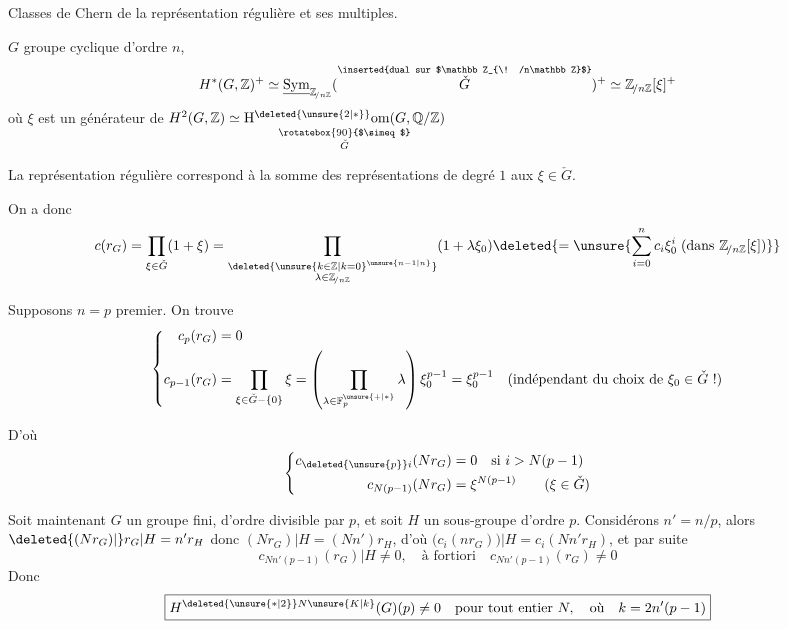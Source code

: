 
Classes de Chern de la représentation régulière et ses multiples.

$G$ groupe cyclique d'ordre $n$,
\[
H^*(G,\mathbb Z)^+ \simeq
\underline{\mathrm{Sym}}_{\mathbb Z_{\! /n\mathbb Z}}
  (\overset{\text{\scriptsize\inserted{dual sur $\mathbb Z_{\! /n\mathbb Z}$}}}{\check G})^+
\simeq \mathbb Z_{\! /n\mathbb Z}[\xi]^+
\]
où $\xi$ est un générateur de
$H^2(G,\mathbb Z)\simeq
\underset{\substack{\rotatebox{90}{$\simeq$}\\ \check G}}{
\mathrm H^{\deleted{\unsure{2|*}}}\mathrm{om}(G,\mathbb Q/\mathbb Z)}$

La représentation régulière   correspond à la somme des représentations de degré $1$  aux  $\xi\in\check G$.

On a donc
\[
c(r_G)=\prod_{\xi\in\check G}(1+\xi)
=\prod_{\substack{\deleted{{\unsure{k\in\mathbb Z|k=0}}^{\unsure{n-1|n}}}\\ \lambda\in\mathbb Z_{\! /n\mathbb Z}}}(1+\lambda\xi_0)
\deleted{=\unsure{\sum_{i=0}^{n}c_i\xi_0^i\;(\text{dans }\mathbb Z_{\! /n\mathbb Z}[\xi])}}
\]

Supposons $n=p$ premier. On trouve
\[
\left\{\begin{aligned}
c_p(r_G)&=0\\
c_{p-1}(r_G)&=\prod_{\xi\in\check G-\{0\}}\xi
=\left(\prod_{\lambda\in\mathbb F_p^{\unsure{+|*}}}\lambda\right)\xi_0^{p-1}
=\xi_0^{p-1}\quad \text{(indépendant du choix de $\xi_0\in\check G$ !)}
\end{aligned}\right.
\]

D'où
\[
\left\{\begin{aligned}
c_{\deleted{\unsure{p}}i}(Nr_G)&=0\quad\text{si }i>N(p-1)\\
c_{N(p-1)}(Nr_G)&=\xi^{N(p-1)}\qquad(\xi\in\check G)
\end{aligned}\right.
\]

Soit maintenant $G$ un groupe fini, d'ordre divisible par $p$,  et soit $H$ un sous-groupe d'ordre $p$. Considérons $n'=n/p$, alors $\deleted{(Nr_G)\vert}r_G\vert H=n'r_H$ donc $(Nr_G)\vert H=(Nn')r_H$, d'où $\bigl(c_i(nr_G)\bigr)\vert H=c_i(Nn'r_H)$, et par suite
\[
c_{Nn'(p-1)}(r_G)\vert H\ne0,\quad\text{à fortiori}\quad c_{Nn'(p-1)}(r_G)\ne0
\]
Donc
\[
\boxed{H^{\deleted{\unsure{*|2}}N\unsure{K|k}}(G)(p)\ne0\quad\text{pour tout entier }N,\quad\text{où}\quad k=2n'(p-1)}
\]
